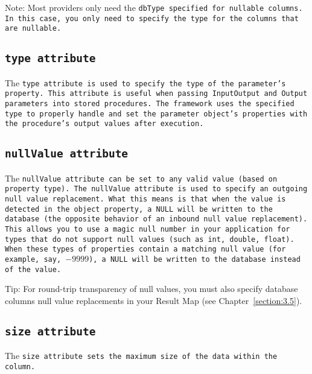 \begin{mybox}{Note:}
Most providers only need the \tt{dbType} specified for nullable columns. In
this case, you only need to specify the type for the columns that are
nullable.
\end{mybox}

\subsection{\tt{type} attribute}
The \tt{type} attribute is used to specify the type of the parameter's
property. This attribute is useful when passing \tt{InputOutput} and
\tt{Output} parameters into stored procedures. The framework uses the
specified type to properly handle and set the parameter object's properties
with the procedure's output values after execution.


\subsection{\tt{nullValue} attribute}\label{section:nullValueParameter}
The \tt{nullValue} attribute can be set to any valid value (based on property
type). The \tt{nullValue} attribute is used to specify an outgoing null value
replacement. What this means is that when the value is detected in the object
property, a NULL will be written to the database (the opposite behavior of an
inbound null value replacement). This allows you to use a magic null number in
your application for types that do not support null values (such as int,
double, float). When these types of properties contain a matching null value
(for example, say, $-9999$), a NULL will be written to the database instead of
the value.


\begin{mybox}{Tip:}
For round-trip transparency of null values, you must also specify database
columns null value replacements in your Result Map (see
Chapter~\ref{section:3.5}).
\end{mybox}


\subsection{\tt{size} attribute}
The \tt{size} attribute sets the maximum size of the data within the column.

